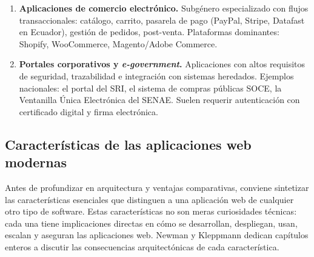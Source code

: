 \begin{enumerate}
\item \textbf{Aplicaciones de comercio electrónico.} Subgénero
especializado con flujos transaccionales: catálogo, carrito, pasarela
de pago (PayPal, Stripe, Datafast en Ecuador), gestión de pedidos,
post-venta. Plataformas dominantes: Shopify, WooCommerce,
Magento/Adobe Commerce.

\item \textbf{Portales corporativos y \emph{e-government}.}
Aplicaciones con altos requisitos de seguridad, trazabilidad e
integración con sistemas heredados. Ejemplos nacionales: el portal
del SRI, el sistema de compras públicas SOCE, la Ventanilla Única
Electrónica del SENAE. Suelen requerir autenticación con certificado
digital y firma electrónica.
\end{enumerate}

\subsection{Características de las aplicaciones web modernas}

Antes de profundizar en arquitectura y ventajas comparativas, conviene
sintetizar las características esenciales que distinguen a una
aplicación web de cualquier otro tipo de software. Estas
características no son meras curiosidades técnicas: cada una tiene
implicaciones directas en cómo se desarrollan, despliegan, usan,
escalan y aseguran las aplicaciones web. Newman \cite{newman2021building}
y Kleppmann \cite{kleppmann2017designing} dedican capítulos enteros a
discutir las consecuencias arquitectónicas de cada característica.

